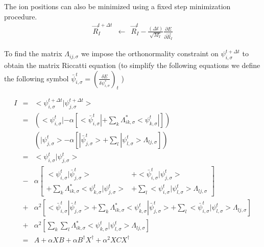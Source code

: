 The ion positions can also be minimized using a fixed step minimization 
procedure.
\begin{eqnarray}
\vec{R}_I^{t+\Delta t} &\leftarrow& 
                      \vec{R}_I^{t}
                    - \frac{(\Delta t)}{\sqrt{M_I}} 
                       \frac{\partial E}{\partial \vec{R}_I}
\end{eqnarray}
                      
\noindent
To find the matrix $\Lambda_{ij,\sigma}$ we impose the orthonormality
constraint on $\psi_{i,\sigma}^{t+\Delta t}$ to obtain the
matrix Riccatti equation 
(to simplify the following equations we define the following symbol
$\bar{\psi}_{i,\sigma}^{t} =  
              \left(\frac{\delta E}{\delta \psi_{i,\sigma}^{*}} \right)_{t}$
)

\begin{eqnarray}
I &=& <\psi_{i,\sigma}^{t+\Delta t} | \psi_{j,\sigma}^{t+\Delta t}> \nonumber \\
  &=& 
   \left( <\psi_{i,\sigma}^{t}| 
          - \alpha  
            \left[
                  <\bar{\psi}_{i,\sigma}^{t}| 
                  + \sum_{k} \Lambda_{ik,\sigma}^{*} <\psi_{k,\sigma}^{t}|
            \right]
   \right) \nonumber \\
& & 
   \left( |\psi_{j,\sigma}^{t}> 
          - \alpha  
            \left[
                  |\bar{\psi}_{j,\sigma}^{t}> 
                  + \sum_{l} |\psi_{l,\sigma}^{t}> \Lambda_{lj,\sigma} 
            \right]
   \right) \nonumber \\
  &=& <\psi_{i,\sigma}^{t}| \psi_{j,\sigma}^{t}> \nonumber \\
  &-& \alpha 
       \left[ 
         \begin{array}{ll}
           <\psi_{i,\sigma}^{t}| \bar{\psi}_{j,\sigma}^{t}> &
         + <\bar{\psi}_{i,\sigma}^{t}| \psi_{j,\sigma}^{t}> \\
         + \sum_{k} \Lambda_{ik,\sigma}^{*} 
                     <\psi_{k,\sigma}^{t}| \psi_{j,\sigma}^{t}> &
         + \sum_{l} <\psi_{i,\sigma}^{t}| \psi_{l,\sigma}^{t}>
                    \Lambda_{lj,\sigma} 
        \end{array}
       \right] \nonumber \\
  &+& \alpha^2 
       \left[
               <\bar{\psi}_{i,\sigma}^{t}| \bar{\psi}_{j,\sigma}^{t}> 
            + \sum_{k} \Lambda_{ik,\sigma}^{*} 
                    <\psi_{k,\sigma}^{t}| \bar{\psi}_{j,\sigma}^{t}> 
            + \sum_{l} <\bar{\psi}_{i,\sigma}^{t}| \psi_{l,\sigma}^{t}>
                         \Lambda_{lj,\sigma} 
       \right]     \nonumber \\
  &+& \alpha^2 
       \left[
                \sum_{k} \sum_{l}
                 \Lambda_{ik,\sigma}^{*} 
                 <\psi_{k,\sigma}^{t}|\psi_{l,\sigma}^{t}>
                 \Lambda_{lj,\sigma} 
       \right] \nonumber \\
  &=& A + \alpha XB + \alpha B^{\dag}X^{\dag} + \alpha^2 XCX^{\dag} 
\label{eq:sd4}
\end{eqnarray}

